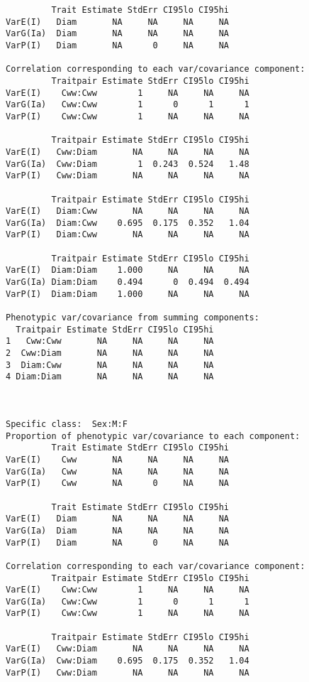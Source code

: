 \documentclass[titlepage]{article}  %
\begin{document}
\begin{verbatim}
         Trait Estimate StdErr CI95lo CI95hi
VarE(I)   Diam       NA     NA     NA     NA
VarG(Ia)  Diam       NA     NA     NA     NA
VarP(I)   Diam       NA      0     NA     NA

Correlation corresponding to each var/covariance component:
         Traitpair Estimate StdErr CI95lo CI95hi
VarE(I)    Cww:Cww        1     NA     NA     NA
VarG(Ia)   Cww:Cww        1      0      1      1
VarP(I)    Cww:Cww        1     NA     NA     NA

         Traitpair Estimate StdErr CI95lo CI95hi
VarE(I)   Cww:Diam       NA     NA     NA     NA
VarG(Ia)  Cww:Diam        1  0.243  0.524   1.48
VarP(I)   Cww:Diam       NA     NA     NA     NA

         Traitpair Estimate StdErr CI95lo CI95hi
VarE(I)   Diam:Cww       NA     NA     NA     NA
VarG(Ia)  Diam:Cww    0.695  0.175  0.352   1.04
VarP(I)   Diam:Cww       NA     NA     NA     NA

         Traitpair Estimate StdErr CI95lo CI95hi
VarE(I)  Diam:Diam    1.000     NA     NA     NA
VarG(Ia) Diam:Diam    0.494      0  0.494  0.494
VarP(I)  Diam:Diam    1.000     NA     NA     NA

Phenotypic var/covariance from summing components:
  Traitpair Estimate StdErr CI95lo CI95hi
1   Cww:Cww       NA     NA     NA     NA
2  Cww:Diam       NA     NA     NA     NA
3  Diam:Cww       NA     NA     NA     NA
4 Diam:Diam       NA     NA     NA     NA



Specific class:  Sex:M:F 
Proportion of phenotypic var/covariance to each component:
         Trait Estimate StdErr CI95lo CI95hi
VarE(I)    Cww       NA     NA     NA     NA
VarG(Ia)   Cww       NA     NA     NA     NA
VarP(I)    Cww       NA      0     NA     NA

         Trait Estimate StdErr CI95lo CI95hi
VarE(I)   Diam       NA     NA     NA     NA
VarG(Ia)  Diam       NA     NA     NA     NA
VarP(I)   Diam       NA      0     NA     NA

Correlation corresponding to each var/covariance component:
         Traitpair Estimate StdErr CI95lo CI95hi
VarE(I)    Cww:Cww        1     NA     NA     NA
VarG(Ia)   Cww:Cww        1      0      1      1
VarP(I)    Cww:Cww        1     NA     NA     NA

         Traitpair Estimate StdErr CI95lo CI95hi
VarE(I)   Cww:Diam       NA     NA     NA     NA
VarG(Ia)  Cww:Diam    0.695  0.175  0.352   1.04
VarP(I)   Cww:Diam       NA     NA     NA     NA


\end{verbatim}
\end{document}
